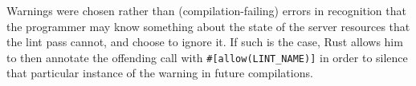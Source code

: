 Warnings were chosen rather than (compilation-failing) errors in recognition that the programmer may know something about the state of the server resources that the lint pass cannot, and choose to ignore it. If such is the case, Rust allows him to then annotate the offending call with \texttt{#[allow(LINT_NAME)]} in order to silence that particular instance of the warning in future compilations.
